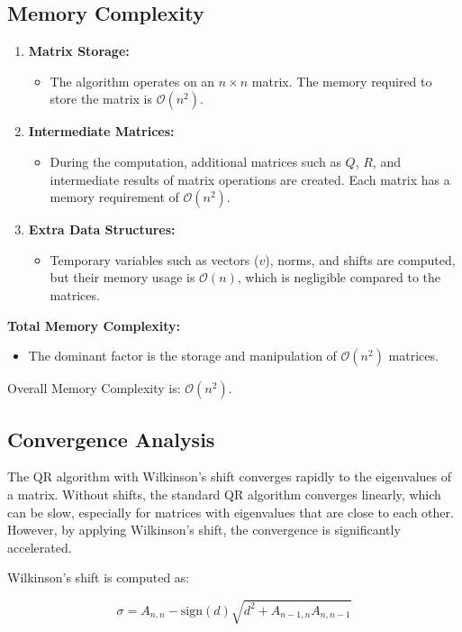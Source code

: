 \documentclass[journal]{IEEEtran}
\begin{document}
\subsection{Memory Complexity}
\begin{enumerate}
    \item \textbf{Matrix Storage:}
    \begin{itemize}
        \item The algorithm operates on an $n \times n$ matrix. The memory required to store the matrix is $\mathcal{O}(n^2)$.
    \end{itemize}

    \item \textbf{Intermediate Matrices:}
    \begin{itemize}
        \item During the computation, additional matrices such as $Q$, $R$, and intermediate results of matrix operations are created. Each matrix has a memory requirement of $\mathcal{O}(n^2)$.
    \end{itemize}

    \item \textbf{Extra Data Structures:}
    \begin{itemize}
        \item Temporary variables such as vectors ($v$), norms, and shifts are computed, but their memory usage is $\mathcal{O}(n)$, which is negligible compared to the matrices.
    \end{itemize}
\end{enumerate}
\noindent \textbf{Total Memory Complexity:}
\begin{itemize}
    \item The dominant factor is the storage and manipulation of $\mathcal{O}(n^2)$ matrices.
\end{itemize}
Overall Memory Complexity is: $\mathcal{O}(n^2)$.
\subsection{Convergence Analysis}
The QR algorithm with Wilkinson's shift converges rapidly to the eigenvalues of a matrix. Without shifts, the standard QR algorithm converges linearly, which can be slow, especially for matrices with eigenvalues that are close to each other. However, by applying Wilkinson's shift, the convergence is significantly accelerated.

Wilkinson's shift is computed as:

\[
\sigma = A_{n,n} - \text{sign}(d) \sqrt{d^2 + A_{n-1,n} A_{n,n-1}}
\]
\end{document}
